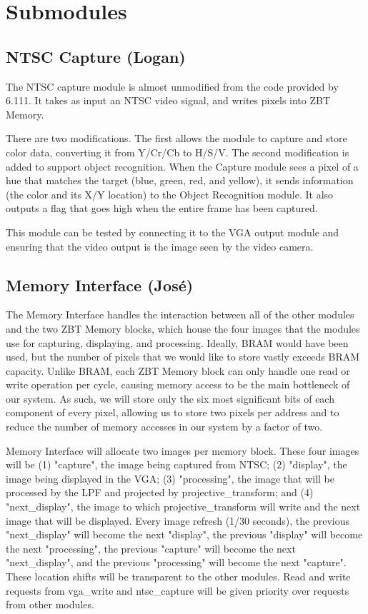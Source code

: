 \documentclass[10pt]{article}
\begin{document}
\section{Submodules}
\subsection{NTSC Capture (Logan)}
The NTSC capture module is almost unmodified from the code provided by 6.111. It takes as input an NTSC video signal, and writes pixels into ZBT Memory.

There are two modifications. The first allows the module to capture and store color data, converting it from Y/Cr/Cb to H/S/V. The second modification is added to support object recognition. When the Capture module sees a pixel of a hue that matches the target (blue, green, red, and yellow), it sends information (the color and its X/Y location) to the Object Recognition module. It also outputs a flag that goes high when the entire frame has been captured.

This module can be tested by connecting it to the VGA output module and ensuring that the video output is the image seen by the video camera.

\subsection{Memory Interface (Jos\'{e})}
The Memory Interface handles the interaction between all of the other modules and the two ZBT Memory blocks, which house the four images that the modules use for capturing, displaying, and processing. Ideally, BRAM would have been used, but the number of pixels that we would like to store vastly exceeds BRAM capacity. Unlike BRAM, each ZBT Memory block can only handle one read or write operation per cycle, causing memory access to be the main bottleneck of our system. As such, we will store only the six most significant bits of each component of every pixel, allowing us to store two pixels per address and to reduce the number of memory accesses in our system by a factor of two.

Memory Interface will allocate two images per memory block. These four images will be (1) "capture", the image being captured from NTSC; (2) "display", the image being displayed in the VGA; (3) "processing", the image that will be processed by the LPF and projected by projective\_transform; and (4) "next\_display", the image to which projective\_transform will write and the next image that will be displayed. Every image refresh (1/30 seconds), the previous "next\_display" will become the next "display", the previous "display" will become the next "processing", the previous "capture" will become the next "next\_display", and the previous "processing" will become the next "capture". These location shifts will be transparent to the other modules. Read and write requests from vga\_write and ntsc\_capture will be given priority over requests from other modules.
\end{document}
